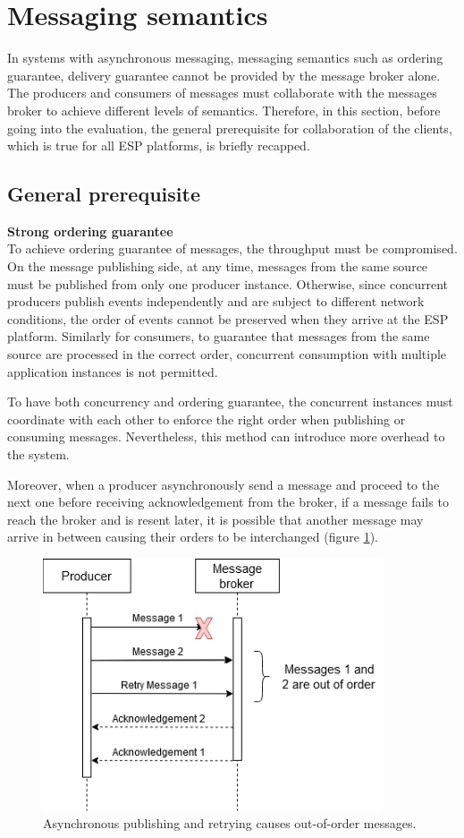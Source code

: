 \section{Messaging semantics} \label{section:semantics}
In systems with asynchronous messaging, messaging semantics such as ordering guarantee, delivery guarantee cannot be provided by the message broker alone. The producers and consumers of messages must collaborate with the messages broker to achieve different levels of semantics. Therefore, in this section, before going into the evaluation, the general prerequisite for collaboration of the clients, which is true for all ESP platforms, is briefly recapped.
\subsection{General prerequisite}
\textbf{Strong ordering guarantee}\\
To achieve ordering guarantee of messages, the throughput must be compromised. On the message publishing side, at any time, messages from the same source must be published from only one producer instance. Otherwise, since concurrent producers publish events independently and are subject to different network conditions, the order of events cannot be preserved when they arrive at the ESP platform. Similarly for consumers, to guarantee that messages from the same source are processed in the correct order, concurrent consumption with multiple application instances is not permitted.

To have both concurrency and ordering guarantee, the concurrent instances must coordinate with each other to enforce the right order when publishing or consuming messages. Nevertheless, this method can introduce more overhead to the system.

Moreover, when a producer asynchronously send a message and proceed to the next one before receiving acknowledgement from the broker, if a message fails to reach the broker and is resent later, it is possible that another message may arrive in between causing their orders to be interchanged (figure \ref{fig:outorderretry}).
\begin{figure}[h]
	\centering
	\includegraphics[width=10cm]{images/order.png}
	\caption{Asynchronous publishing and retrying causes out-of-order messages.}
	\label{fig:outorderretry}
\end{figure}

